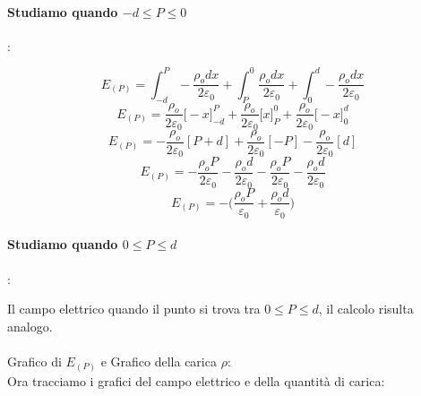 \paragraph{Studiamo quando $-d \le P \le 0$} :

\begin{equation*}
    E_{(P)} = \int_{-d}^P -\frac{\rho_o dx}{2\varepsilon_0} + \int_P^{0} \frac{\rho_o dx}{2\varepsilon_0} + \int_0^{d} -\frac{\rho_o dx}{2\varepsilon_0}
\end{equation*}
\begin{equation*}
    E_{(P)} = \frac{\rho_o}{2\varepsilon_0} \big[-x\big]_{-d}^P  + \frac{\rho_o }{2\varepsilon_0}\big[x\big]_P^{0} + \frac{\rho_o }{2\varepsilon_0}\big[-x\big]_0^{d}
\end{equation*}
\begin{equation*}
    E_{(P)} =  -\frac{\rho_o}{2\varepsilon_0} [P+d] + \frac{\rho_o }{2\varepsilon_0}[-P] - \frac{\rho_o }{2\varepsilon_0}[d]
\end{equation*}
\begin{equation*}
    E_{(P)} =  -\frac{\rho_o P}{2\varepsilon_0} -\frac{\rho_o d}{2\varepsilon_0} -\frac{\rho_o P}{2\varepsilon_0}-\frac{\rho_o d}{2\varepsilon_0}
\end{equation*}
\begin{equation*}
    E_{(P)} =  -\bigg(\frac{\rho_o P}{\varepsilon_0} + \frac{\rho_o d}{\varepsilon_0}\bigg)
\end{equation*}

\paragraph{Studiamo quando $0 \le P \le d$} :

Il campo elettrico quando il punto si trova tra $0 \le P \le d$, il calcolo risulta analogo.

\paragraph{}
Grafico di $E_{(P)}$ e Grafico della carica $\rho$: \\
Ora tracciamo i grafici del campo elettrico e della quantità di carica:

